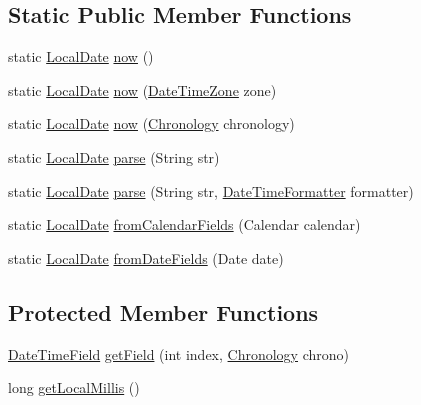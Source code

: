\subsection*{Static Public Member Functions}
\begin{DoxyCompactItemize}
\item 
static \hyperlink{classorg_1_1joda_1_1time_1_1_local_date}{Local\-Date} \hyperlink{classorg_1_1joda_1_1time_1_1_local_date_a502319799ff85a1bc504c993f3a2d28f}{now} ()
\item 
static \hyperlink{classorg_1_1joda_1_1time_1_1_local_date}{Local\-Date} \hyperlink{classorg_1_1joda_1_1time_1_1_local_date_a78f0fb1dc714e8666185de08c2c0c6ad}{now} (\hyperlink{classorg_1_1joda_1_1time_1_1_date_time_zone}{Date\-Time\-Zone} zone)
\item 
static \hyperlink{classorg_1_1joda_1_1time_1_1_local_date}{Local\-Date} \hyperlink{classorg_1_1joda_1_1time_1_1_local_date_a37b467ec92a51b3d1e889d65deca0f8b}{now} (\hyperlink{classorg_1_1joda_1_1time_1_1_chronology}{Chronology} chronology)
\item 
static \hyperlink{classorg_1_1joda_1_1time_1_1_local_date}{Local\-Date} \hyperlink{classorg_1_1joda_1_1time_1_1_local_date_a69cfd2e019250600ec19976f05a8aca5}{parse} (String str)
\item 
static \hyperlink{classorg_1_1joda_1_1time_1_1_local_date}{Local\-Date} \hyperlink{classorg_1_1joda_1_1time_1_1_local_date_a7d693c03933f5cbbbcb95e3bfb738aa8}{parse} (String str, \hyperlink{classorg_1_1joda_1_1time_1_1format_1_1_date_time_formatter}{Date\-Time\-Formatter} formatter)
\item 
static \hyperlink{classorg_1_1joda_1_1time_1_1_local_date}{Local\-Date} \hyperlink{classorg_1_1joda_1_1time_1_1_local_date_a5bddf4d6e20d5133ecd06d79d60e37d2}{from\-Calendar\-Fields} (Calendar calendar)
\item 
static \hyperlink{classorg_1_1joda_1_1time_1_1_local_date}{Local\-Date} \hyperlink{classorg_1_1joda_1_1time_1_1_local_date_a4598c41a94b907bb42136ee8ae1c7cb9}{from\-Date\-Fields} (Date date)
\end{DoxyCompactItemize}
\subsection*{Protected Member Functions}
\begin{DoxyCompactItemize}
\item 
\hyperlink{classorg_1_1joda_1_1time_1_1_date_time_field}{Date\-Time\-Field} \hyperlink{classorg_1_1joda_1_1time_1_1_local_date_acd7759432d44e535e3288eb1cd407c44}{get\-Field} (int index, \hyperlink{classorg_1_1joda_1_1time_1_1_chronology}{Chronology} chrono)
\item 
long \hyperlink{classorg_1_1joda_1_1time_1_1_local_date_a42b9ff9f065fe6510a04a5882393856c}{get\-Local\-Millis} ()
\end{DoxyCompactItemize}


